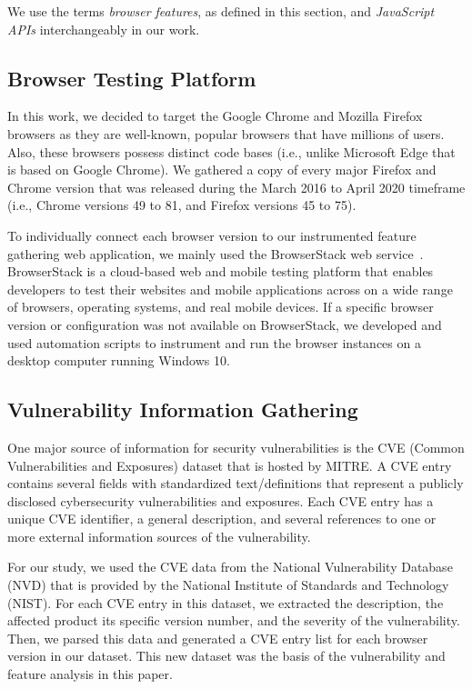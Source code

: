 We use the terms \textit{browser features}, as defined in this section, and \textit{JavaScript APIs} interchangeably in our work.




\subsection{Browser Testing Platform}

In this work, we decided to target the Google Chrome and Mozilla
Firefox browsers as they are well-known, popular browsers that have
millions of users. Also, these browsers possess distinct code bases
(i.e., unlike Microsoft Edge that is based on Google Chrome). We
gathered a copy of every major Firefox and Chrome version that was
released during the March 2016 to April 2020 timeframe (i.e., Chrome
versions 49 to 81, and Firefox versions 45 to 75).

To individually connect each browser version to our instrumented
feature gathering web application, we mainly used the BrowserStack web
service~\cite{browserstack}. BrowserStack is a cloud-based web and mobile testing platform
that enables developers to test their websites and mobile applications
across on a wide range of browsers, operating systems, and real mobile
devices. If a specific browser version or configuration was not
available on BrowserStack, we developed and used automation scripts to
instrument and run the browser instances on a desktop computer running
Windows 10.

\subsection{Vulnerability Information Gathering}

One major source of information for security vulnerabilities is the
CVE (Common Vulnerabilities and Exposures) dataset that is hosted by
MITRE. A CVE entry contains several fields with standardized
text/definitions that represent a publicly disclosed cybersecurity
vulnerabilities and exposures. Each CVE entry has a unique CVE
identifier, a general description, and several references to one or
more external information sources of the vulnerability.

For our study, we used the CVE data from the National Vulnerability
Database (NVD) that is provided by the National Institute of Standards
and Technology (NIST). For each CVE entry in this dataset, we
extracted the description, the affected product its specific version
number, and the severity of the vulnerability. Then, we parsed this
data and generated a CVE entry list for each browser version in our
dataset. This new dataset was the basis of the vulnerability and
feature analysis in this paper.
